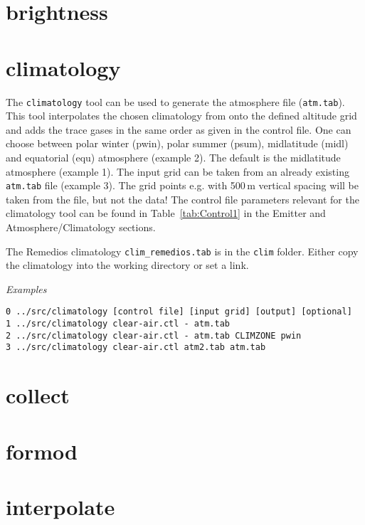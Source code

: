 \section{brightness}

\section{climatology}
\label{sec:ToolClimatology}
The \texttt{climatology} tool can be used to generate the atmosphere file (\texttt{atm.tab}). This tool interpolates the chosen climatology from \citet{Remedios2007} onto the defined altitude grid and adds the trace gases in the same order as given in the control file. One can choose between polar winter (pwin), polar summer (psum), midlatitude (midl) and equatorial (equ) atmosphere (example 2). The default is the midlatitude atmosphere (example 1). The input grid can be taken from an already existing \texttt{atm.tab} file (example 3). The grid points e.g. with 500\,m vertical spacing will be taken from the file, but not the data! The control file parameters relevant for the climatology tool can be found in Table~\ref{tab:Control1} in the Emitter and Atmosphere/Climatology sections.

The Remedios climatology \texttt{clim\_remedios.tab} is in the \texttt{clim} folder. Either copy the climatology into the working directory or set a link.

\emph{Examples}\\
\begin{verbatim}
0 ../src/climatology [control file] [input grid] [output] [optional]
1 ../src/climatology clear-air.ctl - atm.tab
2 ../src/climatology clear-air.ctl - atm.tab CLIMZONE pwin
3 ../src/climatology clear-air.ctl atm2.tab atm.tab
\end{verbatim}

\section{collect}

\section{formod}

\section{interpolate}

